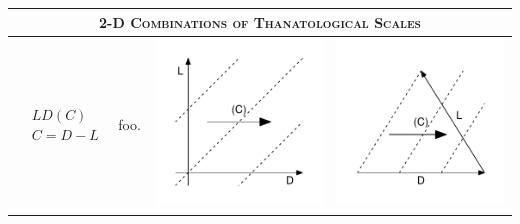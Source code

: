 \documentclass[
  12pt
]{scrartcl}
\begin{document}
\begin{center}
\begin{longtable}{m{}m{}m{}m{}}
  \midrule
  \multicolumn{4}{c}{\textsc{2-D Combinations of Thanatological Scales}} \\
  \midrule
  $$\begin{aligned}
    &LD(C) \\
    &C = D - L
  \end{aligned}$$ &
  foo. &
  \includegraphics[width = \linewidth]{../fig/LDc.pdf} &
  \includegraphics[width = \linewidth]{../fig/LDc_iso.pdf}  \\

\end{longtable}
\end{center}
\end{document}
